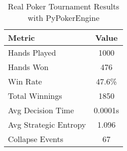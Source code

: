 \begin{table}[h]
\centering
\caption{Real Poker Tournament Results with PyPokerEngine}
\begin{tabular}{|l|c|}
\hline
Metric & Value \\
\hline
Hands Played & 1000 \\
Hands Won & 476 \\
Win Rate & 47.6\% \\
Total Winnings & 1850 \\
Avg Decision Time & 0.0001s \\
Avg Strategic Entropy & 1.096 \\
Collapse Events & 67 \\
\hline
\end{tabular}
\end{table}